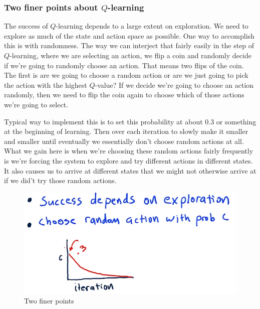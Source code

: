 \documentclass[12pt]{article}
\begin{document}
\subsubsection{Two finer points about $Q$-learning}

\begin{description}[font=$\bullet$\scshape\bfseries]
\item The success of $Q$-learning depends to a large extent on exploration. We need to explore as much of the state and action space as possible. One way to accomplish this is with randomness. The way we can interject that fairly easily in the step of $Q$-learning, where we are selecting an action, we flip a coin and randomly decide if we're going to randomly choose an action. That means two flips of the coin. The first is are we going to choose a random action or are we just going to pick the action with the highest $Q$-value? If we decide we're going to choose an action randomly, then we need to flip the coin again to choose which of those actions we're going to select. 
\item Typical way to implement this is to set this probability at about 0.3 or something at the beginning of learning. Then over each iteration to slowly make it smaller and smaller until eventually we essentially don't choose random actions at all. What we gain here is when we're choosing these random actions fairly frequently is we're forcing the system to explore and try different actions in different states. It also causes us to arrive at different states that we might not otherwise arrive at if we did't try those random actions. 
\end{description}

\begin{figure}[!ht]
\centering
\includegraphics[scale=0.45]{fig/fig107}
\caption{Two finer points}
\end{figure}
\end{document}
